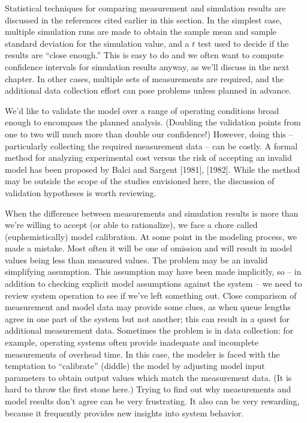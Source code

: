 Statistical techniques for comparing measurement and simulation results are
discussed in the references cited earlier in this section. In the simplest
case, multiple simulation runs are made to obtain the sample mean and sample
standard deviation for the simulation value, and a $t$ test used to decide if
the results are ``close enough.'' This is easy to do and we often want to
compute confidence intervals for simulation results anyway, as we'll discuss in
 the next chapter. In other cases, multiple sets of measurements are required,
and the additional data collection effort can pose problems unless planned in
advance.

We'd like to validate the model over a range of operating conditions broad
enough to encompass the planned analysis. (Doubling the validation points from
one to two will much more than double our confidence!) However, doing this --
particularly collecting the required measurement data -- can be costly. A
formal method for analyzing experimental cost versus the risk of accepting an
invalid model has been proposed by Balci and Sargent [1981], [1982]. While the
method may be outside the scope of the studies envisioned here, the discussion
of validation hypotheses is worth reviewing.

When the difference between measurements and simulation results is more than
we're willing to accept (or able to rationalize), we face a chore called
(euphemistically) model calibration. At some point in the modeling process, we
made a mistake. Most often it will be one of omission and will result in model
values being less than measured values. The problem may be an invalid
simplifying assumption. This assumption may have been made implicitly, so --
 in addition to checking explicit model assumptions against the system -- we
need to review system operation to see if we've left something out. Close
comparison of measurement and model data may provide some clues, as when queue
lengths agree in one part of the system but not another; this can result in a
quest for additional measurement data. Sometimes the problem is in data
collection: for example, operating systems often provide inadequate and
incomplete measurements of overhead time. In this case, the modeler is faced
with the temptation to ``calibrate'' (diddle) the model by adjusting model
input parameters to obtain output values which match the measurement data. (It
is hard to throw the first stone here.) Trying to find out why measurements and
model results don't agree can be very frustrating. It also can be very
rewarding, because it frequently provides new insights into system behavior.

